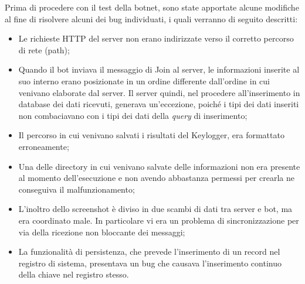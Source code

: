 \medskip
Prima di procedere con il test della botnet, sono state apportate alcune modifiche al fine di risolvere alcuni dei bug individuati, i quali verranno di seguito descritti:
\begin{itemize}
    \item Le richieste HTTP del server non erano indirizzate verso il corretto percorso di rete (path);
    \item Quando il bot inviava il messaggio di Join al server, le informazioni inserite al suo interno erano posizionate in un ordine differente dall'ordine in cui venivano elaborate dal server. Il server quindi, nel procedere all'inserimento in database dei dati ricevuti, generava un'eccezione, poiché i tipi dei dati inseriti non combaciavano con i tipi dei dati della \textit{query} di inserimento;
    \item Il percorso in cui venivano salvati i risultati del Keylogger, era formattato erroneamente;
    \item Una delle directory in cui venivano salvate delle informazioni non era presente al momento dell'esecuzione e non avendo abbastanza permessi per crearla ne conseguiva il malfunzionamento;
    \item L'inoltro dello screenshot è diviso in due scambi di dati tra server e bot, ma era coordinato male. In particolare vi era un problema di sincronizzazione per via della ricezione non bloccante dei messaggi;
    \item La funzionalità di persistenza, che prevede l'inserimento di un record nel registro di sistema, presentava un bug che causava l'inserimento continuo della chiave nel registro stesso.
\end{itemize}

